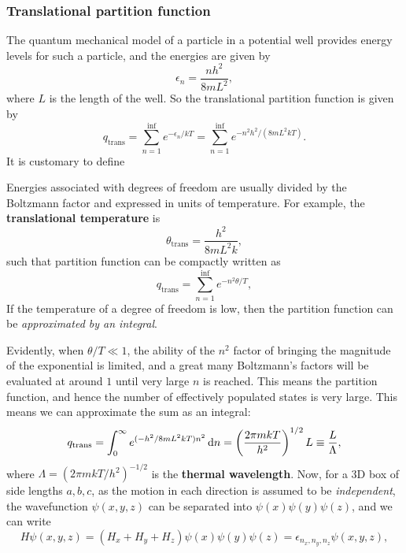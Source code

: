 \subsubsection{Translational partition function}
The quantum mechanical model of a particle in a potential well provides energy 
levels for such a particle, and the energies are given by
\begin{equation}
\epsilon_n=\frac{nh^2}{8mL^2}, 
\end{equation}
where $L$ is the length of the well. 
So the translational partition function is given by
\begin{equation}
q_{\text{trans}}=\sum^{\inf}_{n=1} e^{-\epsilon_n/kT}=\sum^{\inf}_{n=1} e^{-n^2h^2/(8mL^2kT)}.
\end{equation}
It is customary to define
\begin{defi}
Energies associated with degrees of freedom are usually divided by the 
Boltzmann factor and expressed in units of temperature. For example, the 
\textbf{translational temperature} is 
\begin{equation}
\theta_{\text{trans}}=\frac{h^2}{8mL^2k}, 
\end{equation}
such that partition function can be compactly written as 
\begin{equation}
q_{\text{trans}}=\sum^{\inf}_{n=1} e^{-n^2\theta/T},
\end{equation}
If the temperature of a degree of freedom is low, then the partition function 
can be \textit{approximated by an integral}. 
\end{defi}
Evidently, when $\theta/T\ll1$, the ability of the $n^2$ factor of bringing 
the magnitude of the exponential is limited, and a great many Boltzmann's factors 
will be evaluated at around $1$ until very large $n$ is reached. This means 
the partition function, and hence the number of effectively 
populated states is very large. This means we can approximate the sum as an integral: 
\begin{equation}
q_{\text{trans}}=\intinfp e^{(-h^2/8mL^2kT)n^2}\dif n=\lf(\frac{2\pi mkT}{h^2} \rt)^{1/2}L\equiv \frac{L}{\Lambda},
\end{equation}
where $\Lambda=(2\pi mkT/h^2)^{-1/2}$ is the \textbf{thermal wavelength}.
Now, for a 3D box of side lengths $a,b,c$, as the motion in each direction 
is assumed to be \textit{independent}, the wavefunction $\psi(x,y,z)$ can be 
separated into $\psi(x)\psi(y)\psi(z)$, and we can write
\begin{equation}
H\psi(x,y,z)=(H_x+H_y+H_z)\psi(x)\psi(y)\psi(z)=\epsilon_{n_x,n_y,n_z}\psi(x,y,z), 
\end{equation}
